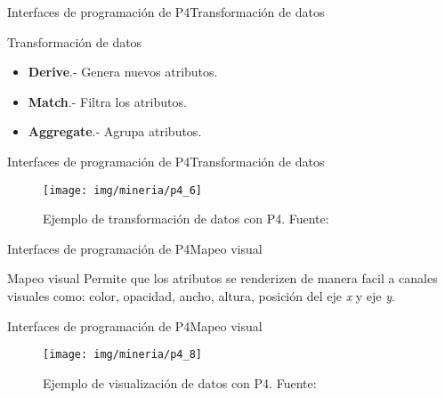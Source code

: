 \documentclass[10pt]{beamer}
\newcommand{\1}{
        	\setbeamertemplate{background}{
        		\texttt{[image: img/1]}
        		\tikz[overlay] \fill[fill opacity=0.75,fill=white] (0,0) rectangle (-\paperwidth,\paperheight);
        	}
}
\begin{document}
\begin{frame}{Interfaces de programación de P4}{Transformación de datos}
	\begin{block}{Transformación de datos}
		\begin{itemize}
			\item \textbf{Derive}.- Genera nuevos atributos. 
			\item \textbf{Match}.- Filtra los  atributos.
			\item \textbf{Aggregate}.- Agrupa atributos. 
		\end{itemize}
	\end{block}	
\end{frame}

\begin{frame}{Interfaces de programación de P4}{Transformación de datos}
	\begin{figure}[]
		\centering
		\texttt{[image: img/mineria/p4\_6]}
		\caption{Ejemplo de transformación de datos con P4. Fuente: \cite{li2018p4}}
	\end{figure}
\end{frame}

\begin{frame}{Interfaces de programación de P4}{Mapeo visual}
	\begin{block}{Mapeo visual}
		Permite que los atributos se renderizen de manera facil a canales visuales como: color, opacidad, ancho, altura, posición del eje \textit{x} y eje \textit{y}.
	\end{block}	
\end{frame}

\begin{frame}{Interfaces de programación de P4}{Mapeo visual}
	\begin{figure}[]
		\centering
		\texttt{[image: img/mineria/p4\_8]}
		\caption{Ejemplo de visualización de datos con P4. Fuente: \cite{li2018p4}}
	\end{figure}
\end{frame}
\end{document}
